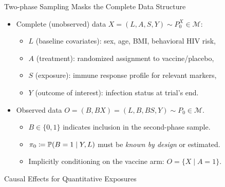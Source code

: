 \documentclass{beamer}
\begin{document}
\begin{frame}[c]{Two-phase Sampling Masks the Complete Data Structure}

\begin{center}
\begin{itemize}
  \itemsep8pt
  \item Complete (unobserved) data $X = (L, A, S, Y) \sim P_0^X \in
    \mathcal{M}$:
    \begin{itemize}
      \itemsep4pt
      \item $L$ (baseline covariates): sex, age, BMI, behavioral HIV risk,
      \item $A$ (treatment): randomized assignment to vaccine/placebo,
      \item $S$ (exposure): immune response profile for relevant markers,
      \item $Y$ (outcome of interest): infection status at trial's end.
    \end{itemize}
  \item Observed data $O = (B, BX) = (L, B, BS, Y) \sim P_0 \in \mathcal{M}$.
    \begin{itemize}
      \itemsep4pt
      \item $B \in \{0,1\}$ indicates inclusion in the second-phase sample.
      \item $\pi_0 \coloneqq \mathbb{P}(B = 1 \mid Y, L)$ must be \textit{known by
        design} or estimated.
      \item Implicitly conditioning on the vaccine arm: $O = \{X \mid A = 1\}$.
    \end{itemize}
\end{itemize}
\end{center}


\end{frame}


\begin{frame}[standout]
  Causal Effects for Quantitative Exposures
\end{frame}

\end{document}
